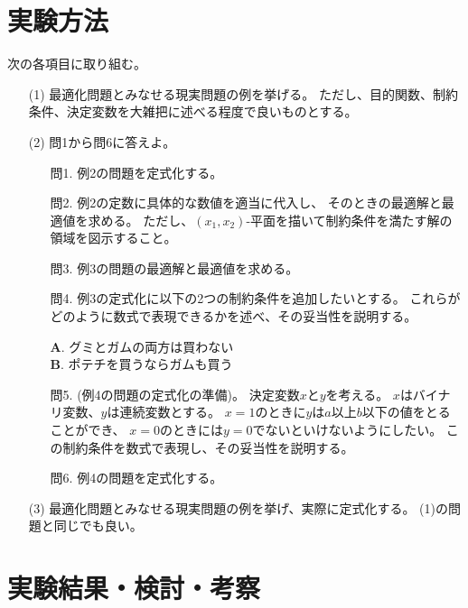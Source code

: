 \documentclass[12pt]{jarticle}
\begin{document}
\clearpage

\section{実験方法}
次の各項目に取り組む。
\begin{itemize}
    \item[(1)] 最適化問題とみなせる現実問題の例を挙げる。
          ただし、目的関数、制約条件、決定変数を大雑把に述べる程度で良いものとする。
    \item[(2)]問1から問6に答えよ。
          \begin{itemize}
              \item[問1.] 例2の問題を定式化する。
              \item[問2.] 例2の定数に具体的な数値を適当に代入し、
                    そのときの最適解と最適値を求める。
                    ただし、$(x_1,x_2)$-平面を描いて制約条件を満たす解の領域を図示すること。
              \item[問3.] 例3の問題の最適解と最適値を求める。
              \item[問4.] 例3の定式化に以下の2つの制約条件を追加したいとする。
                    これらがどのように数式で表現できるかを述べ、その妥当性を説明する。
                    \begin{center}
                        \textbf{A}. グミとガムの両方は買わない\\
                        \textbf{B}. ポテチを買うならガムも買う\\
                    \end{center}
              \item[問5.] (例4の問題の定式化の準備)。
                    決定変数$x$と$y$を考える。
                    $x$はバイナリ変数、$y$は連続変数とする。
                    $x=1$のときに$y$は$a$以上$b$以下の値をとることができ、
                    $x=0$のときには$y=0$でないといけないようにしたい。
                    この制約条件を数式で表現し、その妥当性を説明する。
              \item[問6.] 例4の問題を定式化する。
          \end{itemize}

    \item[(3)]最適化問題とみなせる現実問題の例を挙げ、実際に定式化する。
          (1)の問題と同じでも良い。
\end{itemize}

\section{実験結果・検討・考察}
\end{document}
